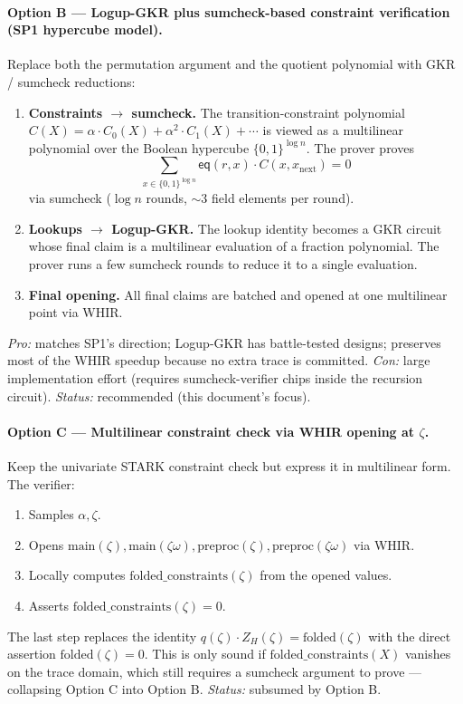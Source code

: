 \paragraph{Option B --- Logup-GKR plus sumcheck-based constraint verification
(SP1 hypercube model).}
Replace both the permutation argument and the quotient polynomial with GKR /
sumcheck reductions:
\begin{enumerate}
  \item \textbf{Constraints $\to$ sumcheck.} The transition-constraint
        polynomial $C(X) = \alpha \cdot C_0(X) + \alpha^2 \cdot C_1(X) + \cdots$
        is viewed as a multilinear polynomial over the Boolean hypercube
        $\{0,1\}^{\log n}$. The prover proves
        $$
          \sum_{x \in \{0,1\}^{\log n}} \mathsf{eq}(r, x) \cdot C(x, x_{\text{next}}) = 0
        $$
        via sumcheck ($\log n$ rounds, $\sim$3 field elements per round).
  \item \textbf{Lookups $\to$ Logup-GKR.} The lookup identity becomes a GKR
        circuit whose final claim is a multilinear evaluation of a fraction
        polynomial. The prover runs a few sumcheck rounds to reduce it to a
        single evaluation.
  \item \textbf{Final opening.} All final claims are batched and opened at
        one multilinear point via WHIR.
\end{enumerate}
\emph{Pro:} matches SP1's direction; Logup-GKR has battle-tested designs;
preserves most of the WHIR speedup because no extra trace is committed.
\emph{Con:} large implementation effort (requires sumcheck-verifier chips
inside the recursion circuit). \emph{Status:} recommended (this document's
focus).

\paragraph{Option C --- Multilinear constraint check via WHIR opening at $\zeta$.}
Keep the univariate STARK constraint check but express it in multilinear
form. The verifier:
\begin{enumerate}
  \item Samples $\alpha, \zeta$.
  \item Opens $\text{main}(\zeta), \text{main}(\zeta \omega), \text{preproc}(\zeta), \text{preproc}(\zeta \omega)$ via WHIR.
  \item Locally computes $\text{folded\_constraints}(\zeta)$ from the opened values.
  \item Asserts $\text{folded\_constraints}(\zeta) = 0$.
\end{enumerate}
The last step replaces the identity $q(\zeta) \cdot Z_H(\zeta) = \text{folded}(\zeta)$
with the direct assertion $\text{folded}(\zeta) = 0$. This is only sound if
$\text{folded\_constraints}(X)$ vanishes on the trace domain, which still
requires a sumcheck argument to prove --- collapsing Option C into
Option B. \emph{Status:} subsumed by Option B.

